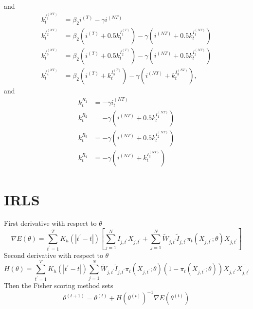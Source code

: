 \documentclass[12pt]{amsart}
\numberwithin{equation}{section}
\theoremstyle{plain}
\begin{document}
and
\begin{align*}
k_t^{I_1^{(NT)}} &= \beta_2 i^{(T)} - \gamma i^{(NT)} \\
k_t^{I_2^{(NT)}} &= \beta_2 (i^{(T)} + 0.5 k_t^{I_1^{(T)}}) - \gamma (i^{(NT)} + 0.5 k_t^{I_1^{(NT)}})\\
k_t^{I_3^{(NT)}} &= \beta_2 (i^{(T)} + 0.5 k_t^{I_2^{(T)}}) - \gamma (i^{(NT)} + 0.5 k_t^{I_2^{(NT)}})\\
k_t^{I_4^{(NT)}} &= \beta_2 (i^{(T)} + k_t^{I_3^{(T)}}) - \gamma (i^{(NT)} + k_t^{I_3^{(NT)}}) ,
\end{align*}
and
\begin{align*}
k_t^{R_1} &= - \gamma i_t^{(NT)} \\
k_t^{R_2} &= - \gamma (i^{(NT)} + 0.5 k_t^{I_1^{(NT)}}) \\
k_t^{R_3} &= - \gamma (i^{(NT)} + 0.5 k_t^{I_2^{(NT)}}) \\
k_t^{R_4} &= - \gamma (i^{(NT)} + k_t^{I_3^{(NT)}}) \\
\end{align*}

\section{IRLS}

First derivative with respect to $\theta$
$$
\nabla E(\theta) = \sum_{t^\prime=1}^T K_h(|t^\prime - t|) \left[ \sum_{j=1}^N I_{j,t^\prime} X_{j,t^\prime} + \sum_{j=1}^N \tilde W_{j,t^\prime} \tilde I_{j,t^\prime} \pi_t (X_{j,t^\prime}; \theta) X_{j,t^\prime} \right]
$$
Second derivative with respect to $\theta$
$$
H(\theta) = \sum_{t^\prime=1}^T K_h(|t^\prime - t|) \sum_{j=1}^N \tilde W_{j,t^\prime} \tilde I_{j,t^\prime} \pi_t (X_{j,t^\prime}; \theta) \left( 1- \pi_t (X_{j,t^\prime}; \theta) \right) X_{j,t^\prime} X_{j,t^\prime}^\top
$$
Then the Fisher scoring method sets
$$
\theta^{(t+1)} = \theta^{(t)} + H \left(\theta^{(t)} \right)^{-1} \nabla E \left(\theta^{(t)} \right)
$$
\end{document}
